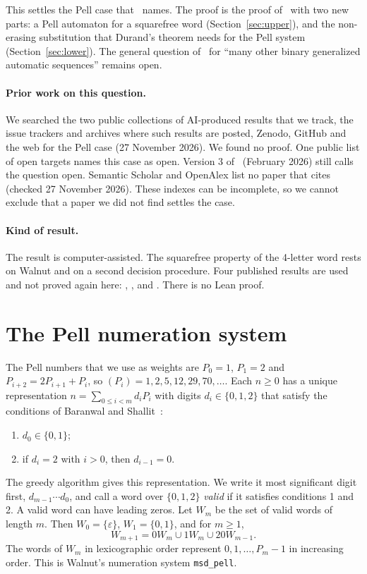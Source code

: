\documentclass[11pt]{article}
\theoremstyle{definition}
\theoremstyle{remark}
\begin{document}
This settles the Pell case that~\cite{ARS} names. The proof is the proof of~\cite[Theorem~11]{ARS} with two new parts: a Pell automaton for a squarefree word (Section~\ref{sec:upper}), and the non-erasing substitution that Durand's theorem needs for the Pell system (Section~\ref{sec:lower}). The general question of~\cite{ARS} for ``many other binary generalized automatic sequences'' remains open.

\paragraph{Prior work on this question.} We searched the two public collections of AI-produced results that we track, the issue trackers and archives where such results are posted, Zenodo, GitHub and the web for the Pell case (27 November 2026). We found no proof. One public list of open targets names this case as open. Version 3 of~\cite{ARS} (February 2026) still calls the question open. Semantic Scholar and OpenAlex list no paper that cites~\cite{ARS} (checked 27 November 2026). These indexes can be incomplete, so we cannot exclude that a paper we did not find settles the case.

\paragraph{Kind of result.} The result is computer-assisted. The squarefree property of the 4-letter word rests on Walnut and on a second decision procedure. Four published results are used and not proved again here: \cite[Lemma~8]{KS}, \cite[Theorem~1]{RSS}, \cite[Lemma~10]{ARS} and \cite[Theorem~1]{Durand}. There is no Lean proof.

\section{The Pell numeration system}

The Pell numbers that we use as weights are $P_0 = 1$, $P_1 = 2$ and $P_{i+2} = 2P_{i+1} + P_i$, so $(P_i) = 1, 2, 5, 12, 29, 70, \dots$. Each $n \ge 0$ has a unique representation $n = \sum_{0 \le i < m} d_i P_i$ with digits $d_i \in \{0,1,2\}$ that satisfy the conditions of Baranwal and Shallit~\cite[Section~2.1]{BS}:
\begin{enumerate}
\item $d_0 \in \{0,1\}$;
\item if $d_i = 2$ with $i > 0$, then $d_{i-1} = 0$.
\end{enumerate}
The greedy algorithm gives this representation. We write it most significant digit first, $d_{m-1} \cdots d_0$, and call a word over $\{0,1,2\}$ \emph{valid} if it satisfies conditions 1 and 2. A valid word can have leading zeros. Let $W_m$ be the set of valid words of length $m$. Then $W_0 = \{\varepsilon\}$, $W_1 = \{0, 1\}$, and for $m \ge 1$,
\begin{equation}\label{eq:W}
W_{m+1} = 0W_m \cup 1W_m \cup 20W_{m-1}.
\end{equation}
The words of $W_m$ in lexicographic order represent $0, 1, \dots, P_m - 1$ in increasing order. This is Walnut's numeration system \texttt{msd\_pell}.
\end{document}
